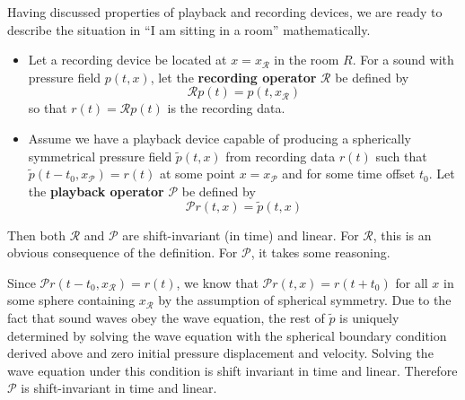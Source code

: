\documentclass{homework}
\begin{document}
	 Having discussed properties of playback and recording devices, we are ready to describe the situation in ``I am sitting in a room'' mathematically.
	 \begin{itemize}
	 	\item Let a recording device be located at \(x=x_\mathcal{R}\) in the room \(R\). For a sound with pressure field \(p(t,x)\), let the \textbf{recording operator} \(\mathcal{R}\) be defined by
	 	\begin{equation*}
	 		\mathcal{R}p(t) = p(t,x_\mathcal{R})
	 	\end{equation*}
 		so that \(r(t) = \mathcal{R}p(t)\) is the recording data.
 		\item Assume we have a playback device capable of producing a spherically symmetrical pressure field \(\tilde{p}(t,x)\) from recording data \(r(t)\) such that \(\tilde{p}(t-t_0, x_\mathcal{P}) = r(t)\) at some point \(x=x_\mathcal{P}\) and for some time offset \(t_0\). Let the \textbf{playback operator} \(\mathcal{P}\) be defined by
 		\begin{equation*}
 			\mathcal{P}r(t,x) = \tilde{p}(t,x)
 		\end{equation*}
	 \end{itemize}
 	 Then both \(\mathcal{R}\) and \(\mathcal{P}\) are shift-invariant (in time) and linear. For \(\mathcal{R}\), this is an obvious consequence of the definition. For \(\mathcal{P}\), it takes some reasoning. 
 	 
 	 Since \(\mathcal{P}r(t-t_0,x_\mathcal{R})=r(t)\), we know that \(\mathcal{P}r(t,x)=r(t+t_0)\) for all \(x\) in some sphere containing \(x_\mathcal{R}\) by the assumption of spherical symmetry. Due to the fact that sound waves obey the wave equation, the rest of \(\tilde{p}\) is uniquely determined by solving the wave equation with the spherical boundary condition derived above and zero initial pressure displacement and velocity. Solving the wave equation under this condition is shift invariant in time and linear. Therefore \(\mathcal{P}\) is shift-invariant in time and linear.
 	 
\end{document}
